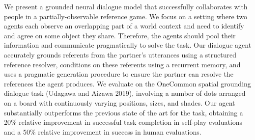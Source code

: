 We present a grounded neural dialogue model that successfully collaborates with people in a partially-observable reference game. We focus on a setting where two agents each observe an overlapping part of a world context and need to identify and agree on some object they share. Therefore, the agents should pool their information and communicate pragmatically to solve the task. Our dialogue agent accurately grounds referents from the partner's utterances using a structured reference resolver, conditions on these referents using a recurrent memory, and uses a pragmatic generation procedure to ensure the partner can resolve the references the agent produces. We evaluate on the OneCommon spatial grounding dialogue task (Udagawa and Aizawa 2019), involving a number of dots arranged on a board with continuously varying positions, sizes, and shades. Our agent substantially outperforms the previous state of the art for the task, obtaining a 20\% relative improvement in successful task completion in self-play evaluations and a 50\% relative improvement in success in human evaluations.
